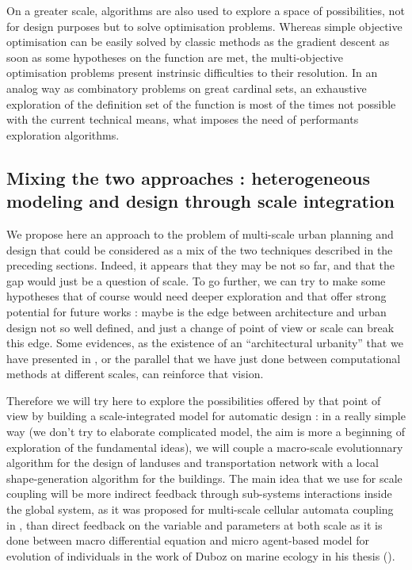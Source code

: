 \documentclass[english]{article}
\begin{document}
On a greater scale, algorithms are also used to explore a space of
possibilities, not for design purposes but to solve optimisation problems.
Whereas simple objective optimisation can be easily solved by classic
methods as the gradient descent as soon as some hypotheses on the
function are met, the multi-objective optimisation problems present
instrinsic difficulties to their resolution. In an analog way as combinatory
problems on great cardinal sets, an exhaustive exploration of the
definition set of the function is most of the times not possible with
the current technical means, what imposes the need of performants
exploration algorithms.


\subsection{Mixing the two approaches : heterogeneous modeling and design through
scale integration}

We propose here an approach to the problem of multi-scale urban planning
and design that could be considered as a mix of the two techniques
described in the preceding sections. Indeed, it appears that they
may be not so far, and that the gap would just be a question of scale.
To go further, we can try to make some hypotheses that of course would
need deeper exploration and that offer strong potential for future
works : maybe is the edge between architecture and urban design not
so well defined, and just a change of point of view or scale can break
this edge. Some evidences, as the existence of an ``architectural
urbanity'' that we have presented in , or the parallel that we have
just done between computational methods at different scales, can reinforce
that vision.

\bigskip{}


Therefore we will try here to explore the possibilities offered by
that point of view by building a scale-integrated model for automatic
design : in a really simple way (we don't try to elaborate complicated
model, the aim is more a beginning of exploration of the fundamental
ideas), we will couple a macro-scale evolutionnary algorithm for the
design of landuses and transportation network with a local shape-generation
algorithm for the buildings. The main idea that we use for scale coupling
will be more indirect feedback through sub-systems interactions inside
the global system, as it was proposed for multi-scale cellular automata
coupling in \cite{MultiScaleCA10}, than direct feedback on the variable
and parameters at both scale as it is done between macro differential
equation and micro agent-based model for evolution of individuals
in the work of Duboz on marine ecology in his thesis (\cite{Duboz:phd}).
\end{document}
